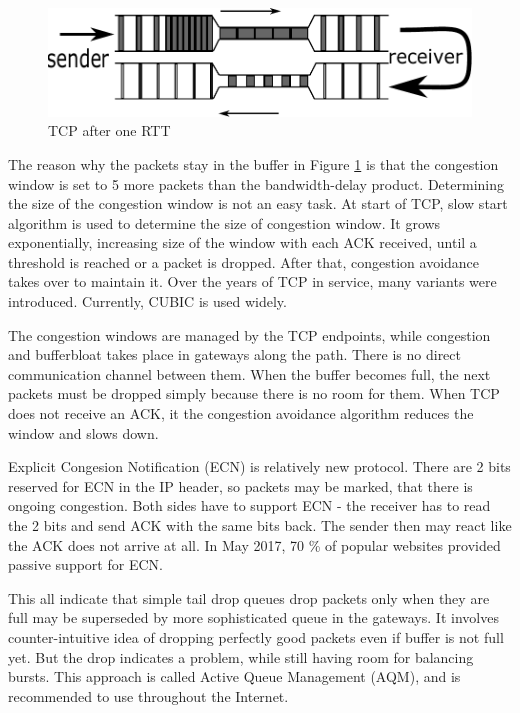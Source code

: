 \begin{figure}
	\centering
	\includegraphics[width=137mm]{drawings/tcp_bottleneck_2}
	\caption{TCP after one RTT}
	
	\label{fig03:bottle_2}
\end{figure}

The reason\XX{,} why the packets stay in the buffer in Figure \ref{fig03:bottle_2} is\XX{,} that the congestion window is set to 5 more packets than the bandwidth-delay product. Determining the size of the congestion window is not an easy task. At start of TCP, slow start algorithm \cite{Jacobson:1988:CAC:52324.52356} is used to determine the size of congestion window. It grows exponentially, increasing size of the window with each ACK received, until a threshold is reached or a packet is dropped. After that, congestion avoidance takes over to maintain it. Over the years of TCP in service, many variants were introduced. Currently, CUBIC \cite{CUBIC} is used widely. 

The congestion windows are managed by the TCP endpoints, while congestion and bufferbloat takes place in gateways along the path. There is no direct communication channel between them. When the buffer becomes full, the next packets must be dropped simply because there is no room for them. When TCP does not receive an ACK, it the congestion avoidance algorithm reduces the window and slows down.

Explicit Congesion Notification (ECN) \cite{rfc3168:ECN} is relatively new protocol. There are 2 bits reserved for ECN in the IP header, so packets may be marked, that there is ongoing congestion. Both sides have to support ECN  - the receiver has to read the 2 bits and send ACK with the same bits back. The sender then may react like the ACK does not arrive at all. In May 2017, 70 \% of popular websites provided passive support for ECN\cite{ECN:proceedings}.

This all indicate that simple tail drop queues drop packets only when they are full may be  superseded by more sophisticated queue  in the gateways. It  involves  counter-intuitive idea of dropping perfectly good packets even if buffer is not full yet. But the drop indicates a problem, while still having room for balancing bursts. This approach is called Active Queue Management (AQM), and is recommended to use throughout the Internet.


